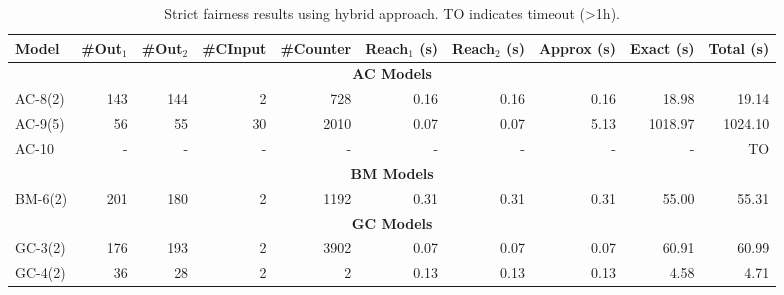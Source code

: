 \begin{table}[htbp]
\centering
\begin{tabular}{|l|r|r|r|r|r|r|r|r|r|}
\hline
Model & \#Out$_1$ & \#Out$_2$ & \#CInput & \#Counter & Reach$_1$ (s) & Reach$_2$ (s) & Approx (s) & Exact (s) & Total (s) \\
\hline
\multicolumn{10}{|c|}{\textbf{AC Models}} \\
\hline
AC-8(2) & 143 & 144 & 2 & 728 & 0.16 & 0.16 & 0.16 & 18.98 & 19.14 \\
AC-9(5) & 56 & 55 & 30 & 2010 & 0.07 & 0.07 & 5.13 & 1018.97 & 1024.10 \\
AC-10 & - & - & - & - & - & - & - & - & TO \\
\hline
\multicolumn{10}{|c|}{\textbf{BM Models}} \\
\hline
BM-6(2) & 201 & 180 & 2 & 1192 & 0.31 & 0.31 & 0.31 & 55.00 & 55.31 \\
\hline
\multicolumn{10}{|c|}{\textbf{GC Models}} \\
\hline
GC-3(2) & 176 & 193 & 2 & 3902 & 0.07 & 0.07 & 0.07 & 60.91 & 60.99 \\
GC-4(2) & 36 & 28 & 2 & 2 & 0.13 & 0.13 & 0.13 & 4.58 & 4.71 \\
\hline
\end{tabular}
\caption{Strict fairness results using hybrid approach. TO indicates timeout (>1h).}
\label{tab:strict_fair_hybrid}
\end{table}